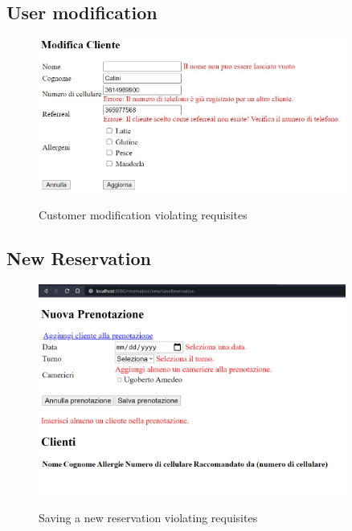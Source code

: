 \documentclass{article}
\begin{document}
\subsection*{User modification}
\begin{figure}[H]
    \centering
    \includegraphics[width=0.9\textwidth]{images/customer_validation_error.jpg}
    \label{fig:customer_validation_error}
    \caption{Customer modification violating requisites}
\end{figure}

\vspace*{5mm}

\subsection*{New Reservation}
\label{sec:new_reservation_form_errors}
\begin{figure}[H]
    \centering
    \includegraphics[width=0.9\textwidth]{images/new_reservation_form_errors}
    \label{fig:new_reservation_form_errors}
    \caption{Saving a new reservation violating requisites}
\end{figure}
\end{document}

